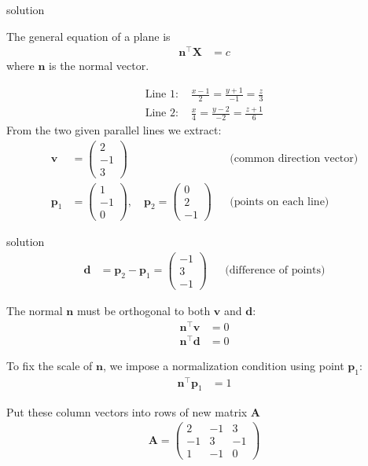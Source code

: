 \documentclass{beamer}
\numberwithin{equation}{section}
\theoremstyle{remark}
\newcommand{\myvec}[1]{\ensuremath{\begin{pmatrix}#1\end{pmatrix}}}
\let\vec\mathbf
\begin{document}
\begin{frame}{solution}

The general equation of a plane is
\begin{align}
\vec{n}^\top \vec{X} &= c
\end{align}
where $\vec{n}$ is the normal vector.

\noindent
\begin{align}
\text{Line 1: } & \frac{x-1}{2} = \frac{y+1}{-1} = \frac{z}{3} \\
\text{Line 2: } & \frac{x}{4} = \frac{y-2}{-2} = \frac{z+1}{6}
\end{align}
From the two given parallel lines we extract:
\begin{align}
\vec{v} &= \myvec{2\\-1\\3} 
&& \text{(common direction vector)} \\
\vec{p}_1 &= \myvec{1\\-1\\0}, \quad 
\vec{p}_2 = \myvec{0\\2\\-1} 
&& \text{(points on each line)} 
\end{align}
\end{frame}
\begin{frame}{solution}
\begin{align}
\vec{d} &= \vec{p}_2 - \vec{p}_1 = \myvec{-1\\3\\-1}
&& \text{(difference of points)}
\end{align}

\noindent
The normal $\vec{n}$ must be orthogonal to both $\vec{v}$ and $\vec{d}$:
\begin{align}
\vec{n}^\top \vec{v} &= 0 \\
\vec{n}^\top \vec{d} &= 0
\end{align}

\noindent
To fix the scale of $\vec{n}$, we impose a normalization condition using point $\vec{p}_1$:
\begin{align}
\vec{n}^\top \vec{p}_1 &= 1
\end{align}

\noindent
Put these column vectors into rows of new matrix $\vec{A}$
\begin{align}
\vec{A} = \myvec{2 & -1 & 3 \\ -1 & 3 & -1 \\ 1 & -1 & 0}
\end{align}
\end{frame}
\end{document}
